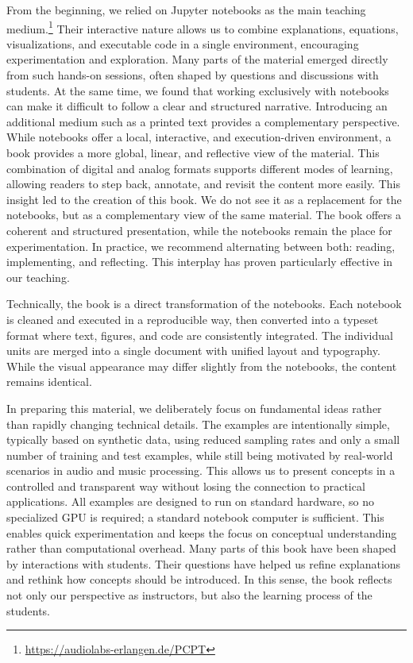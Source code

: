 {From the beginning, we relied on Jupyter notebooks as the main teaching medium.\footnote{\url{https://audiolabs-erlangen.de/PCPT}} Their interactive nature allows us to combine explanations, equations, visualizations, and executable code in a single environment, encouraging experimentation and exploration. Many parts of the material emerged directly from such hands-on sessions, often shaped by questions and discussions with students. At the same time, we found that working exclusively with notebooks can make it difficult to follow a clear and structured narrative. Introducing an additional medium such as a printed text provides a complementary perspective. While notebooks offer a local, interactive, and execution-driven environment, a book provides a more global, linear, and reflective view of the material. This combination of digital and analog formats supports different modes of learning, allowing readers to step back, annotate, and revisit the content more easily. This insight led to the creation of this book. We do not see it as a replacement for the notebooks, but as a complementary view of the same material. The book offers a coherent and structured presentation, while the notebooks remain the place for experimentation. In practice, we recommend alternating between both: reading, implementing, and reflecting. This interplay has proven particularly effective in our teaching.

Technically, the book is a direct transformation of the notebooks. Each notebook is cleaned and executed in a reproducible way, then converted into a typeset format where text, figures, and code are consistently integrated. The individual units are merged into a single document with unified layout and typography. While the visual appearance may differ slightly from the notebooks, the content remains identical.

In preparing this material, we deliberately focus on fundamental ideas rather than rapidly changing technical details. The examples are intentionally simple, typically based on synthetic data, using reduced sampling rates and only a small number of training and test examples, while still being motivated by real-world scenarios in audio and music processing. This allows us to present concepts in a controlled and transparent way without losing the connection to practical applications. All examples are designed to run on standard hardware, so no specialized GPU is required; a standard notebook computer is sufficient. This enables quick experimentation and keeps the focus on conceptual understanding rather than computational overhead. Many parts of this book have been shaped by interactions with students. Their questions have helped us refine explanations and rethink how concepts should be introduced. In this sense, the book reflects not only our perspective as instructors, but also the learning process of the students.

}
